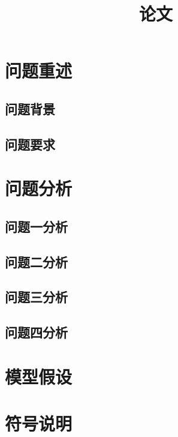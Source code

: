 \documentclass[withoutpreface,bwprint]{cumcmthesis} %
\title{论文}
\begin{document}
	
	\maketitle
	\begin{abstract}
		
		
	\end{abstract}
	
	\tableofcontents
	
	\newpage
	
	\section{问题重述}
		\subsection{问题背景}
		
		\subsection{问题要求}
	
	\section{问题分析}
	
		\subsection{问题一分析}
		
		\subsection{问题二分析}
		
		\subsection{问题三分析}
		
		\subsection{问题四分析}
	
	\section{模型假设}
	
	
	\section{符号说明}
	
\end{document}

